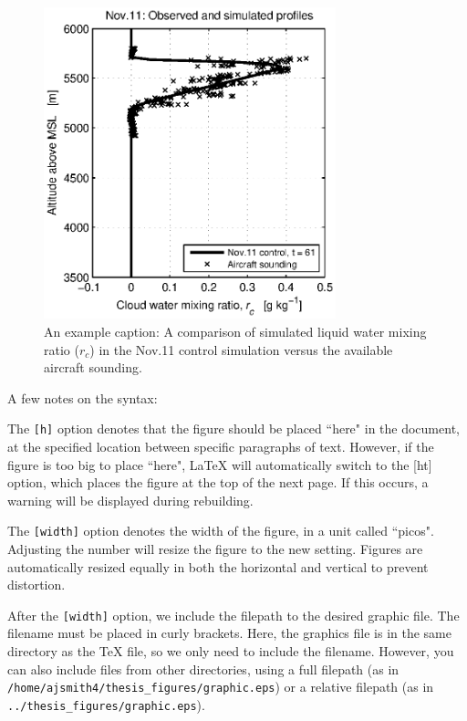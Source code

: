 \documentclass[master]{UWMThesis}
\begin{document}
\begin{figure}[h]
 \centering
 \noindent\includegraphics[width=20pc]
    {nov11_sndg_qcm_compare_t61_bw.eps}
 \caption{An example caption: A comparison of simulated liquid water mixing ratio
          ($r_c$) in the Nov.11 control simulation versus the
          available aircraft sounding.}
 \label{fig:nov11_init_qcm}
\end{figure}

A few notes on the syntax:

The \verb=[h]= option denotes that the figure should be placed ``here" in the document, at the specified location between specific paragraphs of text.  However, if the figure is too big to place ``here", LaTeX will automatically switch to the [ht] option, which places the figure at the top of the next page.  If this occurs, a warning will be displayed during rebuilding.

The \verb=[width]= option denotes the width of the figure, in a unit called ``picos".  Adjusting the number will resize the figure to the new setting.  Figures are automatically resized equally in both the horizontal and vertical to prevent distortion.

After the \verb=[width]= option, we include the filepath to the desired graphic file.  The filename must be placed in curly brackets.  Here, the graphics file is in the same directory as the TeX file, so we only need to include the filename.  However, you can also include files from other directories, using a full filepath (as in \verb=/home/ajsmith4/thesis_figures/graphic.eps=) or a relative filepath (as in \verb=../thesis_figures/graphic.eps=).
\end{document}

